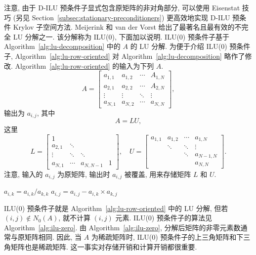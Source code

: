 {注意, 由于 D-ILU 预条件子显式包含原矩阵的非对角部分, 可以使用 Eisenstat 技巧  (另见 Section\ \ref{subsec:stationary-preconditioners}) 更高效地实现 D-ILU 预条件 Krylov 子空间方法.}
{Meijerink 和 van der Vorst  给出了最著名且最有效的不完全 LU 分解之一. 该分解称为 ILU(0), 下面加以说明. ILU(0) 预条件子基于 Algorithm\ \ref{alg:lu-decomposition} 中的 $A$ 的 LU 分解. 为便于介绍 ILU(0) 预条件子, Algorithm\ \ref{alg:lu-row-oriented} 对 Algorithm\ \ref{alg:lu-decomposition} 略作了修改.}
{Algorithm\ \ref{alg:lu-row-oriented} 的输入为下列 $A$.}
\[A=\begin{bmatrix}a_{1,1}&a_{1,2}&\cdots&A_{1,N}\\a_{2,1}&a_{2,2}&\cdots&A_{2,N}\\\vdots&\vdots&\ddots&\vdots\\a_{N,1}&a_{N,2}&\cdots&a_{N,N}\end{bmatrix},\]
{输出为 $a_{i,j}$, 其中}
\[A=LU,\]
{这里}
\[L=\begin{bmatrix}1&&&\\a_{2,1}&\ddots&&\\\vdots&\ddots&\ddots&\\a_{N,1}&\cdots&a_{N,N-1}&1\end{bmatrix},\quad U=\begin{bmatrix}a_{1,1}&a_{1,2}&\cdots&a_{1,N}\\&\ddots&\ddots&\vdots\\&&\ddots&a_{N-1,N}\\&&&a_{N,N}\end{bmatrix}.\]
{注意, 输入的 $a_{i,j}$ 为原矩阵, 输出时 $a_{i,j}$ 被覆盖, 用来存储矩阵 $L$ 和 $U$.}
\begin{algorithm}[H]\caption{{LU 分解 (Algorithm\ \ref{alg:lu-decomposition} 的略微修改版本)}}\label{alg:lu-row-oriented}\begin{algorithmic}[1]
\State $a_{i,k}=a_{i,k}/a_{k,k}$
\State $a_{i,j}=a_{i,j}-a_{i,k}\times a_{k,j}$
\EndFor\EndFor\EndFor\end{algorithmic}\end{algorithm}
{ILU(0) 预条件子就是 Algorithm\ \ref{alg:lu-row-oriented} 中的 LU 分解, 但若 $(i,j)\notin N_0(A)$, 就不计算 $(i,j)$ 元素. ILU(0) 预条件子的算法见 Algorithm\ \ref{alg:ilu-zero}. 由 Algorithm\ \ref{alg:ilu-zero}, 分解后矩阵的非零元素数通常与原矩阵相同. 因此, 当 $A$ 为稀疏矩阵时, ILU(0) 预条件子的上三角矩阵和下三角矩阵也是稀疏矩阵. 这一事实对存储开销和计算开销都很重要.}
